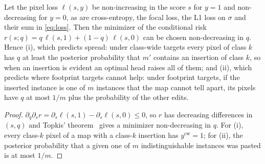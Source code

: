 \begin{proposition}
\label{prop:optimal}
Let the pixel loss $\ell(s,y)$ be non-increasing in the score $s$ for $y=1$ and non-decreasing for $y=0$, as are cross-entropy, the focal loss, the L1 loss on $\sigma$ and their sum in \cref{eq:loss}. Then the minimizer of the conditional risk $r(s;q)=q\,\ell(s,1)+(1-q)\,\ell(s,0)$ can be chosen non-decreasing in $q$. Hence (i), which predicts spread: under class-wide targets every pixel of class $k$ has $q$ at least the posterior probability that $m'$ contains an insertion of class $k$, so when an insertion is evident an optimal head raises all of them; and (ii), which predicts where footprint targets cannot help: under footprint targets, if the inserted instance is one of $m$ instances that the map cannot tell apart, its pixels have $q$ at most $1/m$ plus the probability of the other edits.
\end{proposition}
\begin{proof}
$\partial_q\partial_s r=\partial_s\ell(s,1)-\partial_s\ell(s,0)\le0$, so $r$ has decreasing differences in $(s,q)$ and Topkis' theorem~\cite{topkis1978} gives a minimizer non-decreasing in $q$. For (i), every class-$k$ pixel of a map with a class-$k$ insertion has $y^{\text{cw}}=1$; for (ii), the posterior probability that a given one of $m$ indistinguishable instances was pasted is at most $1/m$.
\end{proof}

